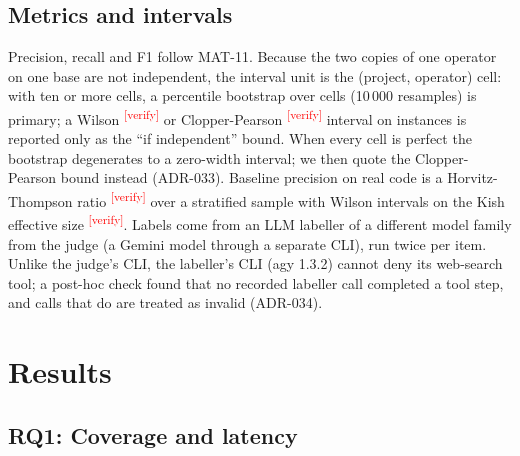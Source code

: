 \documentclass[10pt,a4paper]{article}
\newcommand{\citeneeded}[1]{\cite{#1}\textsuperscript{\textcolor{red}{\tiny[verify]}}}
\begin{document}
\subsection{Metrics and intervals}

Precision, recall and F1 follow MAT-11. Because the two copies of one operator on one base are not independent, the
interval unit is the (project, operator) cell: with ten or more cells, a percentile bootstrap over cells (10\,000
resamples) is primary; a Wilson \citeneeded{wilson1927} or Clopper-Pearson \citeneeded{clopper1934} interval on
instances is reported only as the ``if independent'' bound. %
When every cell is perfect the bootstrap degenerates to a zero-width interval; we then quote the Clopper-Pearson
bound instead (ADR-033). Baseline precision on real code is a Horvitz-Thompson ratio \citeneeded{horvitz1952} over a
stratified sample with Wilson intervals on the Kish effective size \citeneeded{kish1965}. Labels come from an LLM
labeller of a different model family from the judge (a Gemini model through a separate CLI), run twice per item.
Unlike the judge's CLI, the labeller's CLI (agy 1.3.2) cannot deny its web-search tool; a post-hoc check found that
no recorded labeller call completed a tool step, and calls that do are treated as invalid (ADR-034).

\section{Results}\label{sec:results}

\subsection{RQ1: Coverage and latency}\label{sec:rq1}
\end{document}
